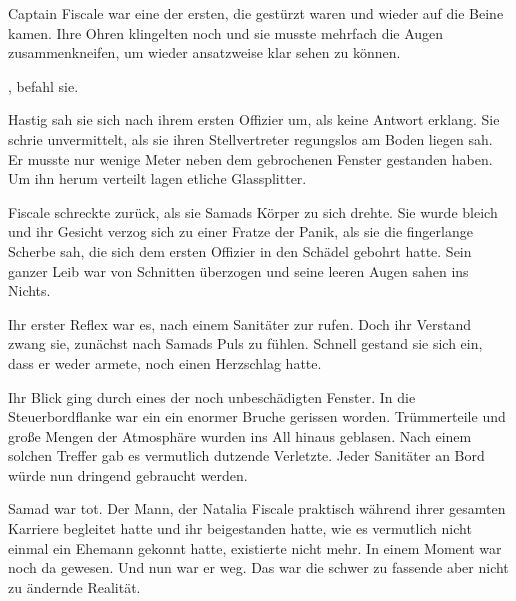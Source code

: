 \par

Captain Fiscale war eine der ersten, die gestürzt waren und wieder auf die Beine kamen. Ihre Ohren klingelten noch und sie musste mehrfach die Augen zusammenkneifen, um wieder ansatzweise klar sehen zu können.

\par

, befahl sie. 

\par

Hastig sah sie sich nach ihrem ersten Offizier um, als keine Antwort erklang.  Sie schrie unvermittelt, als sie ihren Stellvertreter regungslos am Boden liegen sah. Er musste nur wenige Meter neben dem gebrochenen Fenster gestanden haben. Um ihn herum verteilt lagen etliche Glassplitter.

\par

Fiscale schreckte zurück, als sie Samads Körper zu sich drehte. Sie wurde bleich und ihr Gesicht verzog sich zu einer Fratze der Panik, als sie die fingerlange Scherbe sah, die sich dem ersten Offizier in den Schädel gebohrt hatte. Sein ganzer Leib war von Schnitten überzogen und seine leeren Augen sahen ins Nichts.

\par

Ihr erster Reflex war es, nach einem Sanitäter zur rufen. Doch ihr Verstand zwang sie, zunächst nach Samads Puls zu fühlen. Schnell gestand sie sich ein, dass er weder armete, noch einen Herzschlag hatte.

\par

Ihr Blick ging durch eines der noch unbeschädigten Fenster. In die Steuerbordflanke war ein ein enormer Bruche gerissen worden. Trümmerteile und große Mengen der Atmosphäre wurden ins All hinaus geblasen. Nach einem solchen Treffer gab es vermutlich dutzende Verletzte. Jeder Sanitäter an Bord würde nun dringend gebraucht werden.

\par

Samad war tot. Der Mann, der Natalia Fiscale praktisch während ihrer gesamten Karriere begleitet hatte und ihr beigestanden hatte, wie es vermutlich nicht einmal ein Ehemann gekonnt hatte, existierte nicht mehr. In einem Moment war noch da gewesen. Und nun war er weg. Das war die schwer zu fassende aber nicht zu ändernde Realität.

